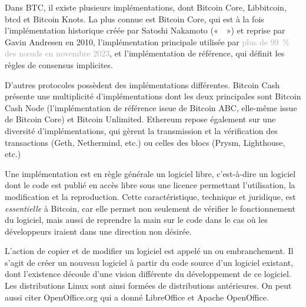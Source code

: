 Dans BTC, il existe plusieurs implémentations, dont Bitcoin Core, Libbitcoin, btcd et Bitcoin Knots. La plus connue est Bitcoin Core, qui est à la fois l'implémentation historique créée par Satoshi Nakamoto («~~») et reprise par Gavin Andresen en 2010, l'implémentation principale utilisée par \textcolor{darkgray}{plus de 99~\% des nœuds en novembre 2023}, et l'implémentation de référence, qui définit les règles de consensus implicites.

D'autres protocoles possèdent des implémentations différentes. Bitcoin Cash présente une multiplicité d'implémentations dont les deux principales sont Bitcoin Cash Node (l'implémentation de référence issue de Bitcoin ABC, elle-même issue de Bitcoin Core) et Bitcoin Unlimited. Ethereum repose également sur une diversité d'implémentations, qui gèrent la transmission et la vérification des transactions (Geth, Nethermind, etc.) ou celles des blocs (Prysm, Lighthouse, etc.)

Une implémentation est en règle générale un logiciel libre, c'est-à-dire un logiciel dont le code est publié en accès libre sous une licence permettant l'utilisation, la modification et la reproduction. Cette caractéristique, technique et juridique, est \emph{essentielle} à Bitcoin, car elle permet non seulement de vérifier le fonctionnement du logiciel, mais aussi de reprendre la main sur le code dans le cas où les développeurs iraient dans une direction non désirée. %

L'action de copier et de modifier un logiciel est appelé un  ou embranchement. Il s'agit de créer un nouveau logiciel à partir du code source d'un logiciel existant, dont l'existence découle d'une vision différente du développement de ce logiciel. Les distributions Linux sont ainsi formées de distributions antérieures. On peut aussi citer OpenOffice.org qui a donné LibreOffice et Apache OpenOffice.

